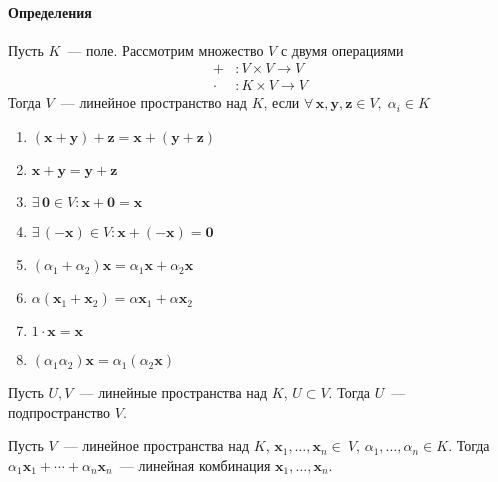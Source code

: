 \documentclass[12pt]{../../notes}
\begin{document}
\setcounter{paragraph}{0}
\paragraph{Определения}
\begin{defn}\label{defn:linspace}
  Пусть $K$~--- поле. Рассмотрим множество  $V$ с двумя операциями
  \begin{align*}  
    + &: V \times V \to V \\
    \cdot &: K\times V \to V
  \end{align*}
  Тогда $V$~--- линейное пространство над $K$, если 
  $\forall\, \mathbf{x},\mathbf{y},\mathbf{z}\in V,\; \alpha_i \in K$
  \begin{enumerate}
    \item $(\mathbf{x}+\mathbf{y}) + \mathbf{z} = \mathbf{x} + (\mathbf{y}+\mathbf{z})$
    \item $\mathbf{x} + \mathbf{y} = \mathbf{y} + \mathbf{z} $
    \item $\exists\, \mathbf{0}\in V : \mathbf{x} + \mathbf{0} = \mathbf{x}$
    \item $\exists\, (-\mathbf{x})\in V : \mathbf{x} + (-\mathbf{x}) = \mathbf{0}$
    \item $(\alpha_1+\alpha_2) \mathbf{x} = \alpha_1 \mathbf{x} + \alpha_2 \mathbf{x}$
    \item $\alpha (\mathbf{x}_1 + \mathbf{x}_2) = \alpha \mathbf{x}_1 + \alpha \mathbf{x}_2$
    \item $1 \cdot \mathbf{x} = \mathbf{x}$
    \item $(\alpha_1 \alpha_2) \mathbf{x} = \alpha_1 (\alpha_2 \mathbf{x})$
  \end{enumerate}
\end{defn}

{ \label{defn:subspace}
  Пусть $U,V$~--- линейные пространства над $K$, $U \subset V$. Тогда $U$~--- подпространство 
  $V$.
}

{ \label{defn:lincomb}
Пусть $V$~--- линейное пространства над $K$, $\mathbf{x}_1, \dotsc, \mathbf{x}_n\in~V$, 
$\alpha_1, \dotsc, \alpha_n \in K$. Тогда $\alpha_1 \mathbf{x}_1 + \dotsb + \alpha_n \mathbf{x}_n$~--- 
линейная комбинация $\mathbf{x}_1, \dotsc, \mathbf{x}_n$.
}
\end{document}
